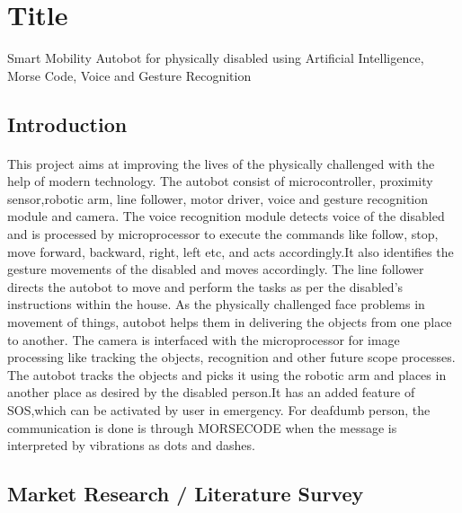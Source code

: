 \documentclass[12pt,a4paper]{article}
\begin{document}
	\doublespacing
	\tableofcontents
	\newpage
	\section{Title}
	Smart Mobility Autobot for physically disabled using Artificial Intelligence, Morse Code, Voice and Gesture Recognition
	\subsection{Introduction}
	\paragraph{}
	This project aims at improving the lives of the physically challenged with the help of modern technology. The autobot consist of microcontroller, proximity sensor,robotic arm, line follower, motor driver, voice and gesture recognition module and camera. The voice recognition module detects voice of the disabled and is processed by microprocessor to execute the commands like follow, stop, move forward, backward, right, left etc, and acts accordingly.It also identifies the gesture movements of the disabled and moves accordingly. The line follower directs the autobot to move and perform the tasks as per the disabled's instructions within the house. As the physically challenged face problems in movement of things, autobot helps them in delivering the objects from one place to another. The camera is interfaced with the microprocessor for image processing like tracking the objects, recognition and other future scope processes. The autobot tracks the objects and picks it using the robotic arm and places in another place as desired by the disabled person.It has an added feature of SOS,which can be activated by user in emergency. For deafdumb person, the communication is done is through MORSECODE when the message is interpreted by vibrations as dots and dashes. 
	\newpage
	\subsection{Market Research / Literature Survey}
\end{document}
